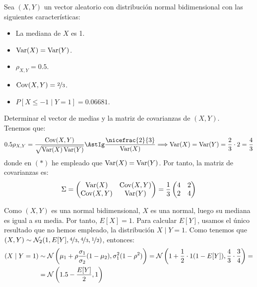 \begin{ejercicio}
    Sea $(X,Y)$ un vector aleatorio con distribución normal bidimensional con las siguientes características:
    \begin{itemize}
        \item La mediana de $X$ es 1.
        \item $\operatorname{Var}(X) = \operatorname{Var}(Y)$.
        \item $\rho_{X,Y} = 0.5$.
        \item $\operatorname{Cov}(X,Y) = \nicefrac{2}{3}$.
        \item $P[X\leq -1\mid Y = 1] = 0.06681$.
    \end{itemize}
    Determinar el vector de medias y la matriz de covarianzas de $(X,Y)$.\\

    Tenemos que:
    \begin{equation*}
        0.5\rho_{X,Y} = \dfrac{\Cov(X,Y)}{\sqrt{\Var(X)\Var(Y)}} \AstIg \dfrac{\nicefrac{2}{3}}{\Var(X)}\Longrightarrow \Var(X) = \Var(Y)=\frac{2}{3}\cdot 2 = \frac{4}{3}
    \end{equation*}
    donde en $(\ast)$ he empleado que $\operatorname{Var}(X) = \operatorname{Var}(Y)$. Por tanto, la matriz de covarianzas es:
    \begin{equation*}
        \Sigma = \begin{pmatrix}
            \operatorname{Var}(X) & \operatorname{Cov}(X,Y)\\
            \operatorname{Cov}(X,Y) & \operatorname{Var}(Y)
        \end{pmatrix} = \frac{1}{3}\begin{pmatrix}
            4 & 2\\
            2 & 4
        \end{pmatrix}
    \end{equation*}

    Como $(X,Y)$ es una normal bidimensional, $X$ es una normal, luego su mediana es igual a su media. Por tanto, $E[X]=1$.
    Para calcular $E[Y]$, usamos el único resultado que no hemos empleado, la distribución $X\mid Y=1$. Como tenemos que $(X,Y)\sim \mathcal{N}_2(1,E[Y],\nicefrac{4}{3},\nicefrac{4}{3}, \nicefrac{1}{2})$, entonces:
    \begin{align*}
        (X\mid Y=1)&\sim \mathcal{N}\left(\mu_1+\rho\dfrac{\sigma_1}{\sigma_2}(1-\mu_2),\sigma_1^2(1-\rho^2)\right)
        = \mathcal{N}\left(1+\dfrac{1}{2}\cdot 1(1-E[Y]),\dfrac{4}{3}\cdot \dfrac{3}{4}\right)
        =\\&= \mathcal{N}\left(1.5-\dfrac{E[Y]}{2},1\right)
    \end{align*}


\end{ejercicio}
